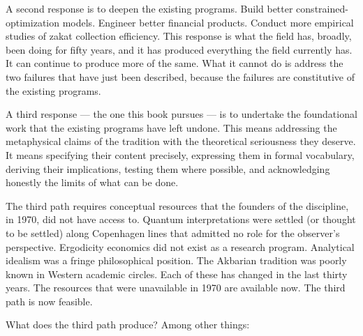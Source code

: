 A second response is to deepen the existing programs. Build better
constrained-optimization models. Engineer better financial products.
Conduct more empirical studies of zakat collection efficiency. This
response is what the field has, broadly, been doing for fifty years,
and it has produced everything the field currently has. It can
continue to produce more of the same. What it cannot do is address
the two failures that have just been described, because the failures
are constitutive of the existing programs.

A third response --- the one this book pursues --- is to undertake
the foundational work that the existing programs have left undone.
This means addressing the metaphysical claims of the tradition with
the theoretical seriousness they deserve. It means specifying their
content precisely, expressing them in formal vocabulary, deriving
their implications, testing them where possible, and acknowledging
honestly the limits of what can be done.

The third path requires conceptual resources that the founders of
the discipline, in 1970, did not have access to. Quantum
interpretations were settled (or thought to be settled) along
Copenhagen lines that admitted no role for the observer's
perspective. Ergodicity economics did not exist as a research
program. Analytical idealism was a fringe philosophical position.
The Akbarian tradition was poorly known in Western academic circles.
Each of these has changed in the last thirty years. The resources
that were unavailable in 1970 are available now. The third path is
now feasible.

What does the third path produce? Among other things:

